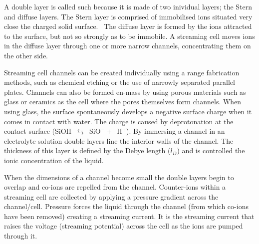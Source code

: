 \documentclass[10pt,final,journal]{IEEEtran}
\begin{document}
    A double layer is called such because it is made of two inividual layers; the Stern and diffuse layers.
    The Stern layer is comprised of immobilised ions situated very close the charged solid surface.~\cite{Salieb-Beugelaar2009}
    The diffuse layer is formed by the ions attracted to the surface, but not so strongly as to be immobile.
    A streaming cell moves ions in the diffuse layer through one or more narrow channels, concentrating them on the other side.

    Streaming cell channels can be created individually using a range fabrication methods, such as chemical etching or the use of narrowly separated parallel plates.
    Channels can also be formed en-mass by using porous materials such as glass or ceramics as the cell where the pores themselves form channels.
    When using glass, the surface spontaneously develops a negative surface charge when it comes in contact with water.
    The charge is caused by deprotonation at the contact surface (SiOH~$\leftrightarrows$~SiO$^{-}+$~H$^{+}$).
    By immersing a channel in an electrolyte solution double layers line the interior walls of the channel.
    The thickness of this layer is defined by the Debye length ($l_{D}$) and is controlled the ionic concentration of the liquid.~\cite{Israelachvili2011}

    When the dimensions of a channel become small the double layers begin to overlap and co-ions are repelled from the channel.
    Counter-ions within a streaming cell are collected by applying a pressure gradient across the channel/cell.
    Pressure forces the liquid through the channel (from which co-ions have been removed) creating a streaming current.
    It is the streaming current that raises the voltage (streaming potential) across the cell as the ions are pumped through it.
\end{document}

